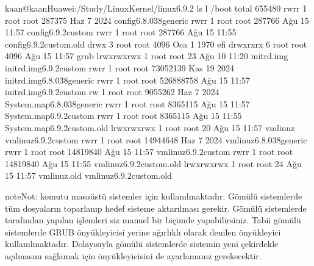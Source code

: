\documentclass[a4paper,10pt,turkish]{sphinxmanual}
\begin{document}
\begin{sphinxVerbatim}[commandchars=\\\{\}]
kaan@kaan\PYGZhy{}Huawei:\PYGZti{}/Study/LinuxKernel/linux\PYGZhy{}6.9.2\PYGZdl{} ls \PYGZhy{}l /boot
total 655480
\PYGZhy{}rw\PYGZhy{}r\PYGZhy{}\PYGZhy{}r\PYGZhy{}\PYGZhy{} 1 root root    287375 Haz  7  2024 config\PYGZhy{}6.8.0\PYGZhy{}38\PYGZhy{}generic
\PYGZhy{}rw\PYGZhy{}r\PYGZhy{}\PYGZhy{}r\PYGZhy{}\PYGZhy{} 1 root root    287766 Ağu 15 11:57 config\PYGZhy{}6.9.2\PYGZhy{}custom
\PYGZhy{}rw\PYGZhy{}r\PYGZhy{}\PYGZhy{}r\PYGZhy{}\PYGZhy{} 1 root root    287766 Ağu 15 11:55 config\PYGZhy{}6.9.2\PYGZhy{}custom.old
drwx\PYGZhy{}\PYGZhy{}\PYGZhy{}\PYGZhy{}\PYGZhy{}\PYGZhy{} 3 root root      4096 Oca  1  1970 efi
drwxr\PYGZhy{}xr\PYGZhy{}x 6 root root      4096 Ağu 15 11:57 grub
lrwxrwxrwx 1 root root        23 Ağu 10 11:20 initrd.img \PYGZhy{}\PYGZgt{} initrd.img\PYGZhy{}6.9.2\PYGZhy{}custom
\PYGZhy{}rw\PYGZhy{}r\PYGZhy{}\PYGZhy{}r\PYGZhy{}\PYGZhy{} 1 root root  73052139 Kas 19  2024 initrd.img\PYGZhy{}6.8.0\PYGZhy{}38\PYGZhy{}generic
\PYGZhy{}rw\PYGZhy{}r\PYGZhy{}\PYGZhy{}r\PYGZhy{}\PYGZhy{} 1 root root 526888758 Ağu 15 11:57 initrd.img\PYGZhy{}6.9.2\PYGZhy{}custom
\PYGZhy{}rw\PYGZhy{}\PYGZhy{}\PYGZhy{}\PYGZhy{}\PYGZhy{}\PYGZhy{}\PYGZhy{} 1 root root   9055262 Haz  7  2024 System.map\PYGZhy{}6.8.0\PYGZhy{}38\PYGZhy{}generic
\PYGZhy{}rw\PYGZhy{}r\PYGZhy{}\PYGZhy{}r\PYGZhy{}\PYGZhy{} 1 root root   8365115 Ağu 15 11:57 System.map\PYGZhy{}6.9.2\PYGZhy{}custom
\PYGZhy{}rw\PYGZhy{}r\PYGZhy{}\PYGZhy{}r\PYGZhy{}\PYGZhy{} 1 root root   8365115 Ağu 15 11:55 System.map\PYGZhy{}6.9.2\PYGZhy{}custom.old
lrwxrwxrwx 1 root root        20 Ağu 15 11:57 vmlinuz \PYGZhy{}\PYGZgt{} vmlinuz\PYGZhy{}6.9.2\PYGZhy{}custom
\PYGZhy{}rw\PYGZhy{}r\PYGZhy{}\PYGZhy{}r\PYGZhy{}\PYGZhy{} 1 root root  14944648 Haz  7  2024 vmlinuz\PYGZhy{}6.8.0\PYGZhy{}38\PYGZhy{}generic
\PYGZhy{}rw\PYGZhy{}r\PYGZhy{}\PYGZhy{}r\PYGZhy{}\PYGZhy{} 1 root root  14819840 Ağu 15 11:57 vmlinuz\PYGZhy{}6.9.2\PYGZhy{}custom
\PYGZhy{}rw\PYGZhy{}r\PYGZhy{}\PYGZhy{}r\PYGZhy{}\PYGZhy{} 1 root root  14819840 Ağu 15 11:55 vmlinuz\PYGZhy{}6.9.2\PYGZhy{}custom.old
lrwxrwxrwx 1 root root        24 Ağu 15 11:57 vmlinuz.old \PYGZhy{}\PYGZgt{} vmlinuz\PYGZhy{}6.9.2\PYGZhy{}custom.old
\end{sphinxVerbatim}

\begin{sphinxadmonition}{note}{Not:}
\sphinxAtStartPar
{} komutu masaüstü sistemler için kullanılmaktadır. Gömülü sistemlerde tüm
dosyaların toparlanıp hedef sisteme aktarılması gerekir. Gömülü sistemlerde 
tarafından yapılan işlemleri siz manuel bir biçimde yapabilirsiniz. Tabii gömülü sistemlerde
GRUB önyükleyicisi yerine ağırlıklı olarak  denilen önyükleyici kullanılmaktadır.
Dolayısıyla gömülü sistemlerde sistemin yeni çekirdekle açılmasını sağlamak için 
önyükleyicisini de ayarlamanız gerekecektir.
\end{sphinxadmonition}
\end{document}
